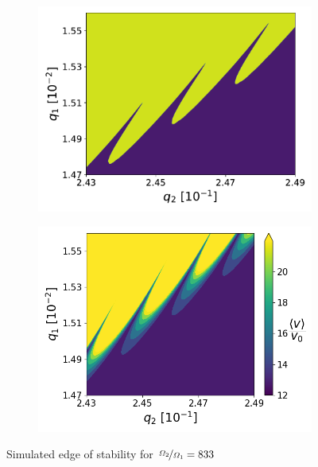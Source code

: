 \begin{figure}[H]
\begin{subfigure}{.5\textwidth}
  \centering
  \includegraphics[width=\linewidth]{img/0_ions_1_electrons_q1_0.0147-0.0156_q2_0.243-0.249_960x960_833.pdf}
  \label{fig:sim-edge_833}
\end{subfigure}%
\begin{subfigure}{.5\textwidth}
  \centering
  \includegraphics[width=\linewidth]{img/0_ions_1_electrons_q1_0.0147-0.0156_q2_0.243-0.249_220x220_833.png}  
  \label{fig:sim-edge-vel_833}
\end{subfigure}
\caption{Simulated edge of stability for $\nicefrac{\Omega_2}{\Omega_1} = 833$}
\label{fig:stabil-edge-eta=833}
\end{figure}

